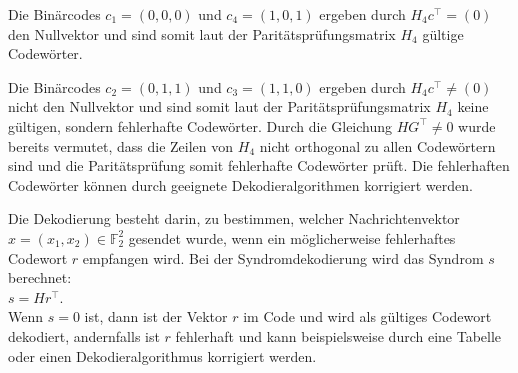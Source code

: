 \begin{Beispiel}
    Die Binärcodes $c_1 =(0,0,0)$ und $c_4=(1,0,1)$ ergeben durch $H_4c^\intercal = (0)$ den Nullvektor und sind somit laut der Paritätspr{\"u}fungsmatrix $H_4$ gültige Codewörter. 
    
    Die Binärcodes $c_2 =(0,1,1)$ und $c_3=(1,1,0)$ ergeben durch $H_4c^\intercal\neq(0)$ nicht den Nullvektor und sind somit laut der Paritätspr{\"u}fungsmatrix $H_4$ keine gültigen, sondern fehlerhafte Codewörter. Durch die Gleichung $HG^\intercal\neq0$  wurde bereits vermutet, dass die Zeilen von $H_4$ nicht orthogonal zu allen Codewörtern sind und die Paritätsprüfung somit fehlerhafte Codewörter prüft. Die fehlerhaften Codewörter können durch geeignete Dekodieralgorithmen korrigiert werden. 
\end{Beispiel}
    
\begin{definition}[Dekodierung]
    Die Dekodierung besteht darin, zu bestimmen, welcher Nachrichtenvektor 
    $x = (x_{1},x_{2}) \in \mathbb{F}_{2}^{2}$ gesendet wurde, wenn ein möglicherweise fehlerhaftes Codewort $r$ empfangen wird. Bei der Syndromdekodierung wird das Syndrom $s$ berechnet:\\
    $s = Hr^\intercal$.\\
    
    Wenn $s = 0$ ist, dann ist der Vektor $r$ im Code und wird als gültiges Codewort dekodiert, andernfalls ist $r$ fehlerhaft und kann beispielsweise durch eine Tabelle oder einen Dekodieralgorithmus korrigiert werden.\cite[S. 6]{huffman}
\end{definition}
    
